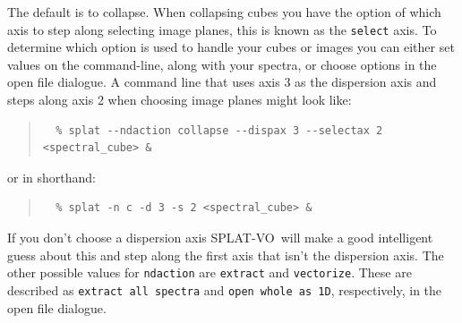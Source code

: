 \documentclass[twoside,11pt]{article}
\newcommand{\htmladdnormallinkfoot}[2]{#1\footnote{#2}}
\renewcommand{\_}{\texttt{\symbol{95}}}
\newcommand{\SPLAT}{\textsf{SPLAT-VO}}
\newcommand{\hitext}[1]{\texttt{#1}}
\newcommand{\ie}{\textit{i.e.}}
\begin{document}
The default is to collapse. When collapsing cubes you have the option of which
axis to step along selecting image planes, this is known as the
\hitext{select} axis. To determine which option is used to handle your cubes or
images you can either set values on the command-line, along with your spectra,
or choose options in the open file dialogue. A command line that uses axis 3 as
the dispersion axis and steps along axis 2 when choosing image planes might
look like:
\begin{quote}
\begin{verbatim}
  % splat --ndaction collapse --dispax 3 --selectax 2 <spectral_cube> &
\end{verbatim}
\end{quote}
or in shorthand:
\begin{quote}
\begin{verbatim}
  % splat -n c -d 3 -s 2 <spectral_cube> &
\end{verbatim}
\end{quote}
If you don't choose a dispersion axis \SPLAT\ will make a good intelligent
guess about this and step along the first axis that isn't the dispersion axis.
The other possible values for \hitext{ndaction} are \hitext{extract} and
\hitext{vectorize}. These are described as \hitext{extract all spectra}
and \hitext{open whole as 1D}, respectively, in the open file dialogue.

%



\end{document}
